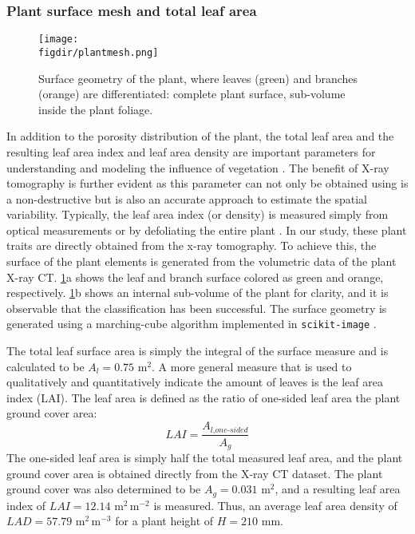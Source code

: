 \subsubsection*{Plant surface mesh and total leaf area}

\begin{figure}[t]
	\centering
	\texttt{[image: \\figdir/plantmesh.png]}
	\caption{Surface geometry of the plant, where leaves (green) and branches (orange) are differentiated:  complete plant surface,  sub-volume inside the plant foliage.}
	\label{fig:plantmesh}
\end{figure}

In addition to the porosity distribution of the plant, the total leaf area and the resulting leaf area index and leaf area density are important parameters for understanding and modeling the influence of vegetation \citep{Manickathan2018a}. The benefit of X-ray tomography is further evident as this parameter can not only be obtained using is a non-destructive but is also an accurate approach to estimate the spatial variability. Typically, the leaf area index (or density) is measured simply from optical measurements or by defoliating the entire plant \citep{Guan2003,Jonckheere2004,Manickathan2018b}. In our study, these plant traits are directly obtained from the x-ray tomography. To achieve this, the surface of the plant elements is generated from the volumetric data of the plant X-ray CT. \cref{fig:plantmesh}a shows the leaf and branch surface colored as green and orange, respectively. \cref{fig:plantmesh}b shows an internal sub-volume of the plant for clarity, and it is observable that the classification has been successful. The surface geometry is generated using a marching-cube algorithm implemented in \texttt{scikit-image} \citep{VanderWalt2014a}.

The total leaf surface area is simply the integral of the surface measure and is calculated to be $A_l=0.75$ m$^2$. A more general measure that is used to qualitatively and quantitatively indicate the amount of leaves is the leaf area index (LAI). The leaf area is defined as the ratio of one-sided leaf area the plant ground cover area:
\begin{equation}
\textit{LAI} = \frac{A_{\textit{l,one-sided}}}{A_g}
\end{equation}
The one-sided leaf area is simply half the total measured leaf area, and the plant ground cover area is obtained directly from the X-ray CT dataset. The plant ground cover was also determined to be $A_g=0.031$ m$^2$, and a resulting leaf area index of $LAI=12.14$ m$^2$\,m$^{-2}$ is measured. Thus, an average leaf area density of $LAD=57.79$ m$^2$\,m$^{-3}$ for a plant height of $H=210$ mm.

